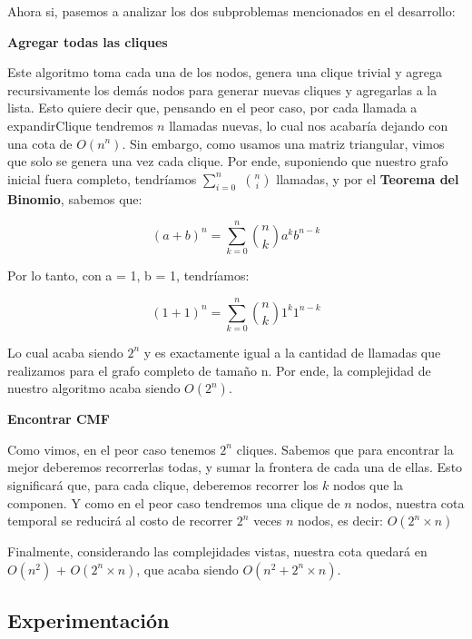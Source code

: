 Ahora si, pasemos a analizar los dos subproblemas mencionados en el desarrollo:

\begin{center}
	\textbf{Agregar todas las cliques}
\end{center}
Este algoritmo toma cada una de los nodos, genera una clique trivial y agrega recursivamente los demás nodos para generar nuevas cliques y agregarlas a la lista. Esto quiere decir que, pensando en el peor caso, por cada llamada a expandirClique tendremos $n$ llamadas nuevas, lo cual nos acabaría dejando con una cota de $O(n^n)$. Sin embargo, como usamos una matriz triangular, vimos que solo se genera una vez cada clique. Por ende, suponiendo que nuestro grafo inicial fuera completo, tendríamos $\sum_{i=0}^{n}$ ${n \choose i}$ llamadas, y por el \textbf{Teorema del Binomio}, sabemos que:
\begin{center}
 $$(a+b)^{n}  = \sum_{k=0}^{n} \binom{n}{k} a^{k}b^{n-k}$$
\end{center}
Por lo tanto, con a = 1, b = 1, tendríamos:
\begin{center}
 $$(1+1)^{n}  = \sum_{k=0}^{n} \binom{n}{k} 1^{k}1^{n-k}$$
\end{center}
Lo cual acaba siendo $2^n$ y es exactamente igual a la cantidad de llamadas que realizamos para el grafo completo de tamaño n. Por ende, la complejidad de nuestro algoritmo acaba siendo $O(2^n)$.

\begin{center}
	\textbf{Encontrar CMF}
\end{center}
Como vimos, en el peor caso tenemos $2^n$ cliques. Sabemos que para encontrar la mejor deberemos recorrerlas todas, y sumar la frontera de cada una de ellas. Esto significará que, para cada clique, deberemos recorrer los $k$ nodos que la componen. Y como en el peor caso tendremos una clique de $n$ nodos, nuestra cota temporal se reducirá al costo de recorrer $2^n$ veces $n$ nodos, es decir: $O(2^n\times n)$
\bigskip

Finalmente, considerando las complejidades vistas, nuestra cota quedará en $O(n^2)$ + $O(2^n \times n)$, que acaba siendo $O(n^2 + 2^n\times n)$.


\subsection{Experimentación}




